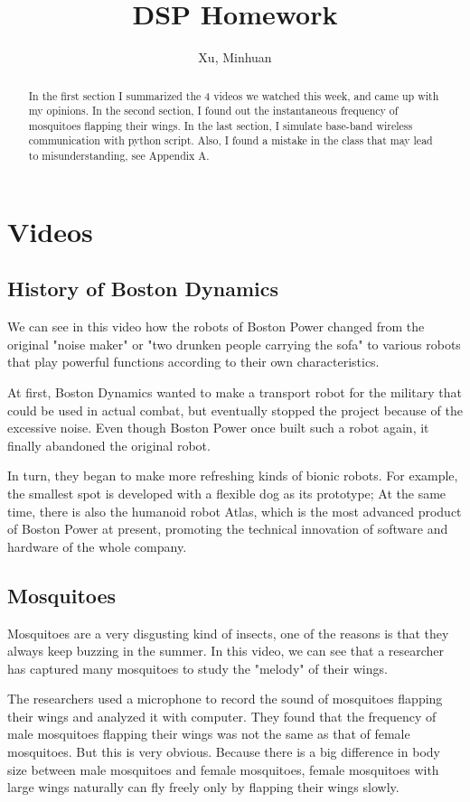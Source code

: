 \documentclass{article}
\begin{document}
\title{DSP Homework}
\author{Xu, Minhuan}
\maketitle
\tableofcontents
\begin{abstract}
In the first section I summarized the 4 videos we watched this week, and came up with my opinions. In the second section, I found out the instantaneous frequency of mosquitoes flapping their wings. In the last section, I simulate base-band wireless communication with python script. Also, I found a mistake in the class that may lead to misunderstanding, see Appendix A.
\end{abstract}

\section{Videos}
\subsection{History of Boston Dynamics}
We can see in this video how the robots of Boston Power changed from the original "noise maker" or "two drunken people carrying the sofa" to various robots that play powerful functions according to their own characteristics.

At first, Boston Dynamics wanted to make a transport robot for the military that could be used in actual combat, but eventually stopped the project because of the excessive noise. Even though Boston Power once built such a robot again, it finally abandoned the original robot.

In turn, they began to make more refreshing kinds of bionic robots. For example, the smallest spot is developed with a flexible dog as its prototype; At the same time, there is also the humanoid robot Atlas, which is the most advanced product of Boston Power at present, promoting the technical innovation of software and hardware of the whole company.

\subsection{Mosquitoes}
Mosquitoes are a very disgusting kind of insects, one of the reasons is that they always keep buzzing in the summer. In this video, we can see that a researcher has captured many mosquitoes to study the "melody" of their wings.

The researchers used a microphone to record the sound of mosquitoes flapping their wings and analyzed it with computer. They found that the frequency of male mosquitoes flapping their wings was not the same as that of female mosquitoes. But this is very obvious. Because there is a big difference in body size between male mosquitoes and female mosquitoes, female mosquitoes with large wings naturally can fly freely only by flapping their wings slowly.
\end{document}
